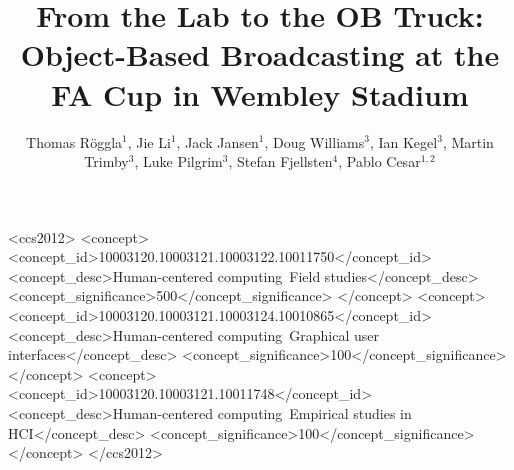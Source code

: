 \documentclass[sigchi-a, authorversion]{acmart}
\begin{document}
\title{From the Lab to the OB Truck: Object-Based Broadcasting at the FA Cup in Wembley Stadium}

\author{Thomas R\"{o}ggla$^1$, Jie Li$^1$, Jack Jansen$^1$, Doug Williams$^3$, Ian Kegel$^3$, Martin Trimby$^3$, Luke Pilgrim$^3$, Stefan Fjellsten$^4$, Pablo Cesar$^{1,2}$}


\renewcommand{\shortauthors}{T. R\"{o}ggla et al.}


%
%
\begin{CCSXML}
    <ccs2012>
        <concept>
            <concept_id>10003120.10003121.10003122.10011750</concept_id>
            <concept_desc>Human-centered computing~Field studies</concept_desc>
            <concept_significance>500</concept_significance>
        </concept>
        <concept>
            <concept_id>10003120.10003121.10003124.10010865</concept_id>
            <concept_desc>Human-centered computing~Graphical user interfaces</concept_desc>
            <concept_significance>100</concept_significance>
        </concept>
        <concept>
            <concept_id>10003120.10003121.10011748</concept_id>
            <concept_desc>Human-centered computing~Empirical studies in HCI</concept_desc>
            <concept_significance>100</concept_significance>
        </concept>
    </ccs2012>
\end{CCSXML}

\end{document}
